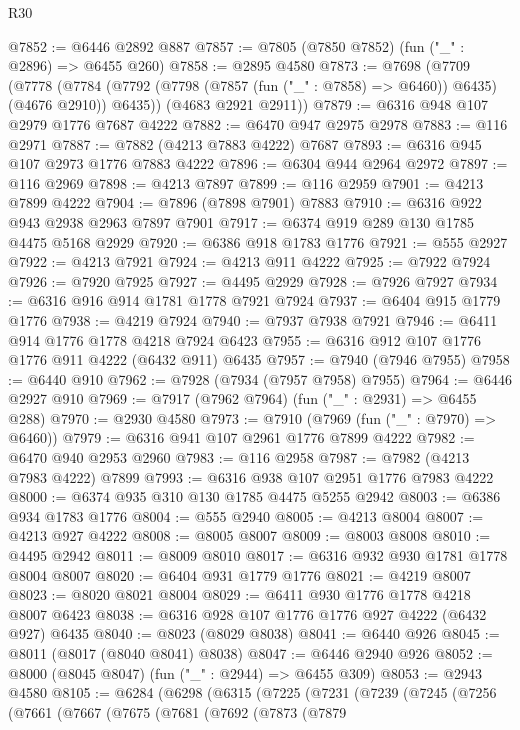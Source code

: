 \begin{lexlean}{R30}
\begin{coremodule}
@7852 := @6446 @2892 @887
@7857 := @7805 (@7850 @7852) (fun ("_" : @2896) => @6455 @260)
@7858 := @2895 @4580
@7873 := @7698
    (@7709
      (@7778 (@7784 (@7792 (@7798 (@7857 (fun ("_" : @7858) => @6460)) @6435) (@4676 @2910)) @6435))
      (@4683 @2921 @2911))
@7879 := @6316 @948 @107 @2979 @1776 @7687 @4222
@7882 := @6470 @947 @2975 @2978
@7883 := @116 @2971
@7887 := @7882 (@4213 @7883 @4222) @7687
@7893 := @6316 @945 @107 @2973 @1776 @7883 @4222
@7896 := @6304 @944 @2964 @2972
@7897 := @116 @2969
@7898 := @4213 @7897
@7899 := @116 @2959
@7901 := @4213 @7899 @4222
@7904 := @7896 (@7898 @7901) @7883
@7910 := @6316 @922 @943 @2938 @2963 @7897 @7901
@7917 := @6374 @919 @289 @130 @1785 @4475 @5168 @2929
@7920 := @6386 @918 @1783 @1776
@7921 := @555 @2927
@7922 := @4213 @7921
@7924 := @4213 @911 @4222
@7925 := @7922 @7924
@7926 := @7920 @7925
@7927 := @4495 @2929
@7928 := @7926 @7927
@7934 := @6316 @916 @914 @1781 @1778 @7921 @7924
@7937 := @6404 @915 @1779 @1776
@7938 := @4219 @7924
@7940 := @7937 @7938 @7921
@7946 := @6411 @914 @1776 @1778 @4218 @7924 @6423
@7955 := @6316 @912 @107 @1776 @1776 @911 @4222 (@6432 @911) @6435
@7957 := @7940 (@7946 @7955)
@7958 := @6440 @910
@7962 := @7928 (@7934 (@7957 @7958) @7955)
@7964 := @6446 @2927 @910
@7969 := @7917 (@7962 @7964) (fun ("_" : @2931) => @6455 @288)
@7970 := @2930 @4580
@7973 := @7910 (@7969 (fun ("_" : @7970) => @6460))
@7979 := @6316 @941 @107 @2961 @1776 @7899 @4222
@7982 := @6470 @940 @2953 @2960
@7983 := @116 @2958
@7987 := @7982 (@4213 @7983 @4222) @7899
@7993 := @6316 @938 @107 @2951 @1776 @7983 @4222
@8000 := @6374 @935 @310 @130 @1785 @4475 @5255 @2942
@8003 := @6386 @934 @1783 @1776
@8004 := @555 @2940
@8005 := @4213 @8004
@8007 := @4213 @927 @4222
@8008 := @8005 @8007
@8009 := @8003 @8008
@8010 := @4495 @2942
@8011 := @8009 @8010
@8017 := @6316 @932 @930 @1781 @1778 @8004 @8007
@8020 := @6404 @931 @1779 @1776
@8021 := @4219 @8007
@8023 := @8020 @8021 @8004
@8029 := @6411 @930 @1776 @1778 @4218 @8007 @6423
@8038 := @6316 @928 @107 @1776 @1776 @927 @4222 (@6432 @927) @6435
@8040 := @8023 (@8029 @8038)
@8041 := @6440 @926
@8045 := @8011 (@8017 (@8040 @8041) @8038)
@8047 := @6446 @2940 @926
@8052 := @8000 (@8045 @8047) (fun ("_" : @2944) => @6455 @309)
@8053 := @2943 @4580
@8105 := @6284
    (@6298
      (@6315
        (@7225
          (@7231
            (@7239
              (@7245
                (@7256
                  (@7661
                    (@7667
                      (@7675
                        (@7681
                          (@7692
                            (@7873
                              (@7879

\end{coremodule}
\end{lexlean}
